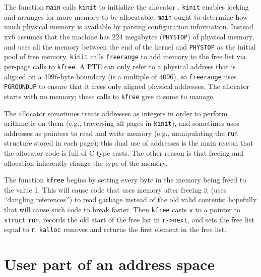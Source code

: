 The function
\lstinline{main}
calls
\lstinline{kinit}
to initialize the allocator
.
\lstinline{kinit}
enables locking and arranges for more memory to be allocatable.
\lstinline{main}
ought to determine how much physical
memory is available by parsing configuration information.
Instead xv6 assumes that the machine has
224 megabytes
(\lstinline{PHYSTOP})
of physical memory, and uses all the memory between the end of the kernel
and
\lstinline{PHYSTOP}
as the initial pool of free memory.
\lstinline{kinit}
calls
\lstinline{freerange}
to add memory to the free list via per-page calls to
\lstinline{kfree}.
A PTE can only refer to a physical address that is aligned
on a 4096-byte boundary (is a multiple of 4096), so
\lstinline{freerange}
uses
\lstinline{PGROUNDUP}
to ensure that it frees only aligned physical addresses.
The allocator starts with no memory;
these calls to
\lstinline{kfree}
give it some to manage.

The allocator sometimes treats addresses as integers
in order to perform arithmetic on them (e.g.,
traversing all pages in
\lstinline{kinit}),
and sometimes uses addresses as pointers to read and
write memory (e.g., manipulating the
\lstinline{run}
structure stored in each page);
this dual use of addresses is the main reason that the
allocator code is full of C type casts.
The other reason is that freeing and allocation inherently
change the type of the memory.

The function
\lstinline{kfree}
begins by setting every byte in the
memory being freed to the value 1.
This will cause code that uses memory after freeing it
(uses ``dangling references'')
to read garbage instead of the old valid contents;
hopefully that will cause such code to break faster.
Then
\lstinline{kfree}
casts
\lstinline{v}
to a pointer to
\lstinline{struct}
\lstinline{run},
records the old start of the free list in
\lstinline{r->next},
and sets the free list equal to
\lstinline{r}.
\lstinline{kalloc}
removes and returns the first element in the free list.
\section{User part of an address space}

